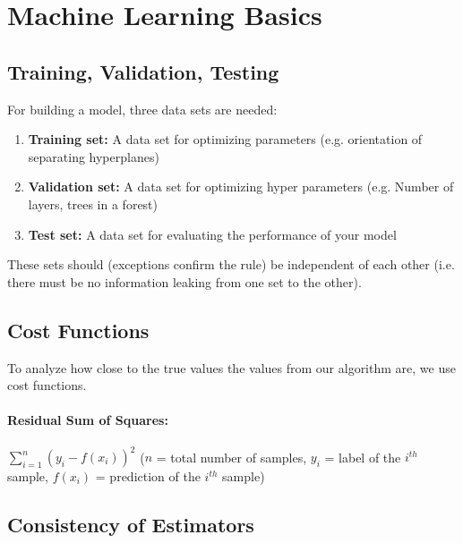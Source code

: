 \documentclass[../main.tex]{subfiles}
\begin{document}
\section{Machine Learning Basics}

\subsection{Training, Validation, Testing}
For building a model, three data sets are needed: 
\begin{enumerate}
    \item \textbf{Training set:} A data set for optimizing parameters (e.g. orientation of separating hyperplanes)
    \item \textbf{Validation set:} A data set for optimizing hyper parameters (e.g. Number of layers, trees in a forest)
    \item \textbf{Test set:} A data set for evaluating the performance of your model
\end{enumerate}
These sets should (exceptions confirm the rule) be independent of each other (i.e. there must be no information leaking from one set to the other).

\subsection{Cost Functions}
To analyze how close to the true values the values from our algorithm are, we use cost functions. 
\paragraph{Residual Sum of Squares: } $\sum_{i=1}^n (y_i - f(x_i))^2$ ($n$ = total number of samples, $y_i$ = label of the $i^{th}$ sample, $f(x_i)$ = prediction of the $i^{th}$ sample)

\subsection{Consistency of Estimators}
\end{document}
